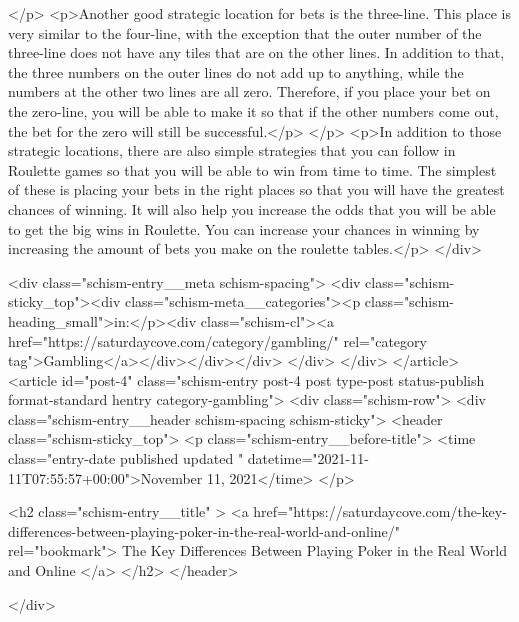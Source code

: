 {</p>
<p>Another good strategic location for bets is the three-line. This place is very similar to the four-line, with the exception that the outer number of the three-line does not have any tiles that are on the other lines. In addition to that, the three numbers on the outer lines do not add up to anything, while the numbers at the other two lines are all zero. Therefore, if you place your bet on the zero-line, you will be able to make it so that if the other numbers come out, the bet for the zero will still be successful.</p>
</p>
<p>In addition to those strategic locations, there are also simple strategies that you can follow in Roulette games so that you will be able to win from time to time. The simplest of these is placing your bets in the right places so that you will have the greatest chances of winning. It will also help you increase the odds that you will be able to get the big wins in Roulette. You can increase your chances in winning by increasing the amount of bets you make on the roulette tables.</p>
		</div>

		<div class="schism-entry__meta schism-spacing">			<div class="schism-sticky_top"><div class="schism-meta__categories"><p class="schism-heading_small">in:</p><div class="schism-cl"><a href="https://saturdaycove.com/category/gambling/" rel="category tag">Gambling</a></div></div></div>		</div>
	</div>
</article>
<article id="post-4" class="schism-entry post-4 post type-post status-publish format-standard hentry category-gambling">
	<div class="schism-row">		<div class="schism-entry__header schism-spacing schism-sticky">			<header class="schism-sticky_top">				<p class="schism-entry__before-title">
					<time class="entry-date published updated " datetime="2021-11-11T07:55:57+00:00">November 11, 2021</time>				</p>

				<h2 class="schism-entry__title" >
					<a href="https://saturdaycove.com/the-key-differences-between-playing-poker-in-the-real-world-and-online/" rel="bookmark">
						The Key Differences Between Playing Poker in the Real World and Online					</a>
				</h2>
			</header>

					</div>

}
